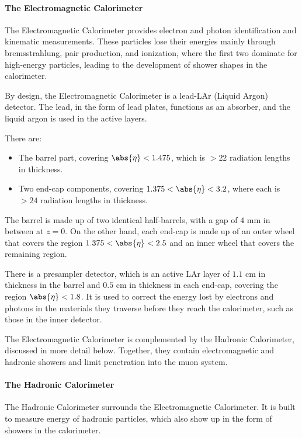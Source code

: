 \paragraph{The Electromagnetic Calorimeter}\label{p:emc} The Electromagnetic
Calorimeter provides electron and photon identification and kinematic
measurements. These particles lose their energies mainly through
bremsstrahlung, pair production, and ionization, where the first two dominate
for high-energy particles, leading to the development of shower shapes in the
calorimeter.

By design, the Electromagnetic Calorimeter is a lead-LAr (Liquid Argon)
detector. The lead, in the form of lead plates, functions as an absorber, and
the liquid argon is used in the active layers.


\vspace{3mm}

There are:

\begin{itemize}

	\item The barrel part, covering $\abs{\eta} < 1.475 $, which is $> 22$
	      radiation lengths in thickness.

	\item Two end-cap components, covering $1.375 < \abs{\eta} < 3.2$, where each
	      is $>24$ radiation lengths in thickness.

\end{itemize}

The barrel is made up of two identical half-barrels, with a gap of $4$ mm in
between at $z=0$. On the other hand, each end-cap is made up of an outer wheel
that covers the region $1.375 < \abs{\eta} < 2.5$ and an inner wheel that
covers the remaining region.

There is a presampler detector, which is an active LAr layer of $1.1$ cm in
thickness in the barrel and $0.5$ cm in thickness in each end-cap, covering the
region $\abs{\eta} < 1.8$. It is used to correct the energy lost by electrons
and photons in the materials they traverse before they reach the calorimeter,
such as those in the inner detector.



The Electromagnetic Calorimeter is complemented by the Hadronic Calorimeter,
discussed in more detail below. Together, they contain electromagnetic and
hadronic showers and limit penetration into the muon system.

\paragraph{The Hadronic Calorimeter} The Hadronic Calorimeter surrounds the
Electromagnetic Calorimeter. It is built to measure energy of hadronic
particles, which also show up in the form of showers in the calorimeter.


